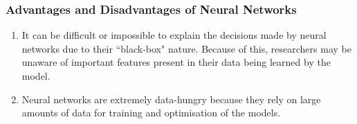 \documentclass{beamer}
\begin{document}
\begin{frame}
\frametitle{Advantages and Disadvantages of Neural Networks}
\begin{tcolorbox}
[colback=blue!5!white,colframe=blue!75!black,title= Disadvantages of Neural Networks]
\begin{enumerate}
    \item It can be difficult or impossible to explain the decisions made by neural networks due to their ``black-box" nature. Because of this, researchers may be unaware of important features present in their data being learned by the model.
    \item Neural networks are extremely data-hungry because they rely on large amounts of data for training and optimisation of the models.
\end{enumerate}
\end{tcolorbox}
\end{frame}
\end{document}
